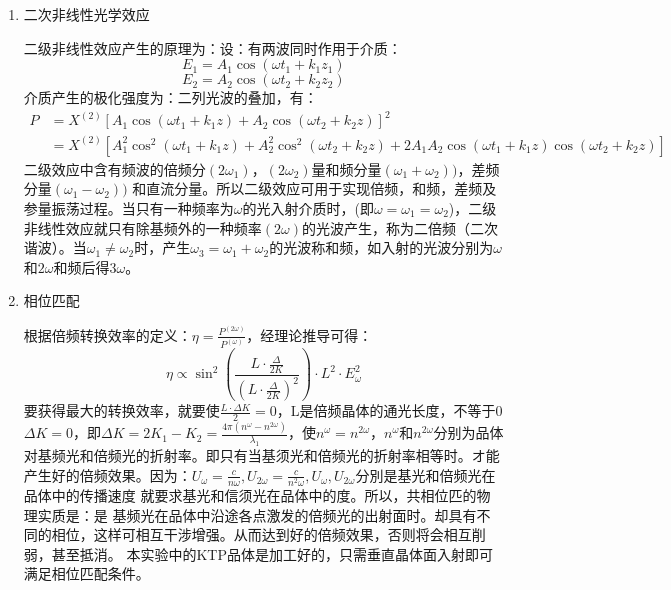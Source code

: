 \documentclass[UTF8]{ctexart}
\begin{document}
\begin{enumerate}
\begin{enumerate}
		\item 二次非线性光学效应
		
		二级非线性效应产生的原理为：设：有两波同时作用于介质：
		\begin{equation}
			E_{1}=A_{1}\cos(\omega t_{1}+k_{1}z_{1})
		\end{equation}
		\begin{equation}
			E_{2}=A_{2}\cos(\omega t_{2}+k_{2}z_{2})
		\end{equation}
		介质产生的极化强度为：二列光波的叠加，有：
		\begin{equation}
		\begin{aligned}
		P&=X^(2)[A_{1}\cos(\omega t_{1}+k_{1}z)+A_{2}\cos(\omega t_{2}+k_{2}z)]^{2}\\
		 &=X^(2)[A^{2}_{1}\cos^{2}(\omega t_{1}+k_{1}z)+A^{2}_{2}\cos^{2}(\omega t_{2}+k_{2}z)+2A_{1}A_{2}\cos(\omega t_{1}+k_{1}z)\cos(\omega t_{2}+k_{2}z)]
		\end{aligned}
		\end{equation}
		二级效应中含有频波的倍频分$(2\omega_{1})$，$(2\omega_{2})$量和频分量$(\omega_{1}+\omega_{2}))$，差频分量$(\omega_{1}-\omega_{2}))$
		和直流分量。所以二级效应可用于实现倍频，和频，差频及参量振荡过程。当只有一种频率为$\omega$的光入射介质时，(即$\omega=\omega_{1}=\omega_{2}$)，二级非线性效应就只有除基频外的一种频率$(2\omega)$的光波产生，称为二倍频（二次谐波）。当$\omega_{1}\neq\omega_{2}$时，产生$\omega_{3}=\omega_{1}+\omega_{2}$的光波称和频，如入射的光波分别为$\omega$和$2\omega$和频后得$3\omega$。
		
		\item 相位匹配
		
		根据倍频转换效率的定义：$\eta=\frac{P^{(2\omega)}}{P^{(\omega)}}$，经理论推导可得：
		$$\eta \propto \sin^{2}(\frac{L\cdot \frac{\Delta}{2K}}{(L\cdot \frac{\Delta}{2K})^{2}})\cdot L^{2}\cdot E^{2}_{\omega}$$
要获得最大的转换效率，就要使$\frac{L\cdot \Delta K}{2}=0$，L是倍频晶体的通光长度，不等于0$\Delta K=0$，即$\Delta K=2K_{1}-K_{2}=\frac{4\pi(n^{\omega}-n^{2\omega})}{\lambda_{1}}$，使$n^{\omega}=n^{2\omega}$，$n^{\omega}$和$n^{2\omega}$分别为品体对基频光和倍频光的折射率。即只有当基须光和倍频光的折射率相等时。オ能产生好的倍频效果。因为：$U_{\omega}=\frac{c}{n\omega},U_{2\omega}=\frac{c}{n^{2}\omega},U_{\omega},U_{2\omega}$分別是基光和倍频光在品体中的传播速度
就要求基光和信须光在品体中的度。所以，共相位匹的物理实质是：是
基频光在品体中沿途各点激发的倍频光的出射面时。却具有不同的相位，这样可相互干涉增强。从而达到好的倍频效果，否则将会相互削弱，甚至抵消。
本实验中的KTP品体是加工好的，只需垂直晶体面入射即可满足相位匹配条件。
	\end{enumerate}
\end{enumerate}
\end{document}
